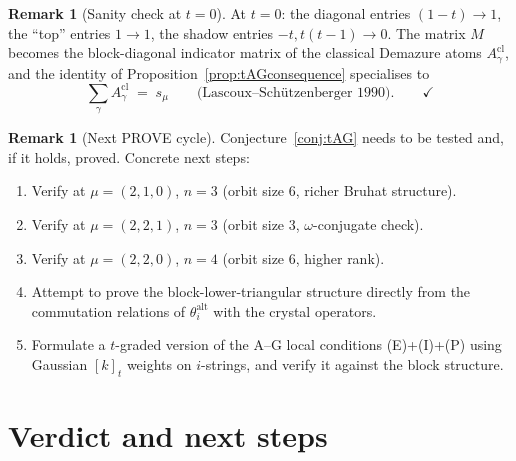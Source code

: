 \documentclass[11pt]{article}
\theoremstyle{definition}
\newtheorem{remark}[theorem]{Remark}
\newcommand{\thalt}{\theta^{\mathrm{alt}}}
\begin{document}
\begin{remark}[Sanity check at $t=0$]
At $t = 0$: the diagonal entries $(1-t) \to 1$, the ``top'' entries $1 \to 1$, the shadow entries $-t, t(t-1) \to 0$. The matrix $M$ becomes the block-diagonal indicator matrix of the classical Demazure atoms $A^{\mathrm{cl}}_\gamma$, and the identity of Proposition~\ref{prop:tAGconsequence} specialises to
\[
\sum_\gamma A^{\mathrm{cl}}_\gamma \;=\; s_\mu\qquad\text{(Lascoux--Sch\"{u}tzenberger 1990)}. \qquad\checkmark
\]
\end{remark}

\begin{remark}[Next PROVE cycle]
Conjecture~\ref{conj:tAG} needs to be tested and, if it holds, proved. Concrete next steps:
\begin{enumerate}
\item Verify at $\mu = (2,1,0)$, $n=3$ (orbit size $6$, richer Bruhat structure).
\item Verify at $\mu = (2,2,1)$, $n=3$ (orbit size $3$, $\omega$-conjugate check).
\item Verify at $\mu = (2,2,0)$, $n=4$ (orbit size $6$, higher rank).
\item Attempt to prove the block-lower-triangular structure directly from the commutation relations of $\thalt_i$ with the crystal operators.
\item Formulate a $t$-graded version of the A--G local conditions (E)+(I)+(P) using Gaussian $[k]_t$ weights on $i$-strings, and verify it against the block structure.
\end{enumerate}
\end{remark}

\section{Verdict and next steps}
\end{document}
